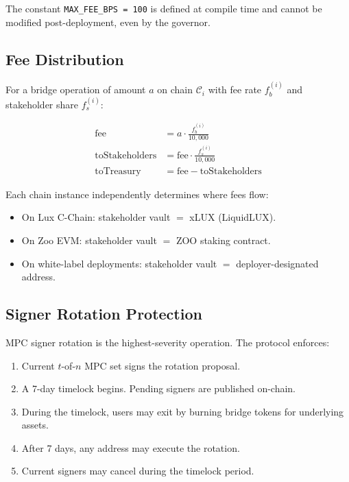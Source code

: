 \documentclass[11pt,twocolumn]{article}
\theoremstyle{definition}
\newcommand{\Chain}{\mathcal{C}}
\begin{document}
\noindent
The constant \texttt{MAX\_FEE\_BPS = 100} is defined at compile time and cannot be modified post-deployment, even by the governor.

\subsection{Fee Distribution}

For a bridge operation of amount $a$ on chain $\Chain_i$ with fee rate $f_b^{(i)}$ and stakeholder share $f_s^{(i)}$:

\begin{align}
  \text{fee} &= a \cdot \frac{f_b^{(i)}}{10{,}000} \\
  \text{toStakeholders} &= \text{fee} \cdot \frac{f_s^{(i)}}{10{,}000} \\
  \text{toTreasury} &= \text{fee} - \text{toStakeholders}
\end{align}

Each chain instance independently determines where fees flow:
\begin{itemize}[nosep]
  \item On Lux C-Chain: stakeholder vault $=$ xLUX (LiquidLUX).
  \item On Zoo EVM: stakeholder vault $=$ ZOO staking contract.
  \item On white-label deployments: stakeholder vault $=$ deployer-designated address.
\end{itemize}

\subsection{Signer Rotation Protection}

MPC signer rotation is the highest-severity operation. The protocol enforces:

\begin{enumerate}[nosep]
  \item Current $t$-of-$n$ MPC set signs the rotation proposal.
  \item A 7-day timelock begins. Pending signers are published on-chain.
  \item During the timelock, users may exit by burning bridge tokens for underlying assets.
  \item After 7 days, any address may execute the rotation.
  \item Current signers may cancel during the timelock period.
\end{enumerate}
\end{document}
